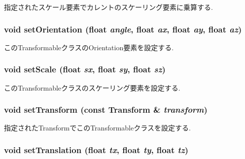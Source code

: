 指定されたスケール要素でカレントのスケーリング要素に乗算する. \hypertarget{classm3g_1_1Transformable_980a9a2b5f6102763042e616d3aa4606}{
\subsubsection[{setOrientation}]{\setlength{\rightskip}{0pt plus 5cm}void setOrientation (float {\em angle}, \/  float {\em ax}, \/  float {\em ay}, \/  float {\em az})}}
\label{classm3g_1_1Transformable_980a9a2b5f6102763042e616d3aa4606}


このTransformableクラスのOrientation要素を設定する. \hypertarget{classm3g_1_1Transformable_937d04042c25021532ea2532fe5e3a32}{
\subsubsection[{setScale}]{\setlength{\rightskip}{0pt plus 5cm}void setScale (float {\em sx}, \/  float {\em sy}, \/  float {\em sz})}}
\label{classm3g_1_1Transformable_937d04042c25021532ea2532fe5e3a32}


このTransformableクラスのスケーリング要素を設定する. \hypertarget{classm3g_1_1Transformable_05052269aaf19775f3ff1a10d042777e}{
\subsubsection[{setTransform}]{\setlength{\rightskip}{0pt plus 5cm}void setTransform (const {\bf Transform} \& {\em transform})}}
\label{classm3g_1_1Transformable_05052269aaf19775f3ff1a10d042777e}


指定されたTransformでこのTransformableクラスを設定する. \hypertarget{classm3g_1_1Transformable_afd728a7db85b8e12bdafc2b3c08a515}{
\subsubsection[{setTranslation}]{\setlength{\rightskip}{0pt plus 5cm}void setTranslation (float {\em tx}, \/  float {\em ty}, \/  float {\em tz})}}
\label{classm3g_1_1Transformable_afd728a7db85b8e12bdafc2b3c08a515}



